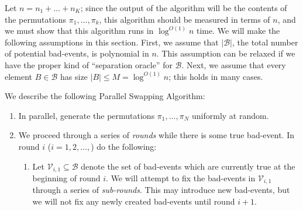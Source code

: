 Let $n = n_1 + \dots + n_K$; since the output of the algorithm will be the contents of the permutations $\pi_1, \dots, \pi_k$, this algorithm should be measured in terms of $n$, and we must show that this algorithm runs in $\log^{O(1)} n$ time.  We will make the following assumptions in this section.  First, we assume that $|\mathcal B|$, the total number of potential bad-events, is polynomial in $n$. This assumption can be relaxed if we have the proper kind of ``separation oracle'' for $\mathcal B$. Next, we assume that every element $B \in \mathcal B$ has size $|B| \leq M = \log^{O(1)} n$; this holds in many cases.

We describe the following Parallel Swapping Algorithm:
\begin{enumerate}
\item In parallel, generate the permutations $\pi_1, \dots, \pi_N$ uniformly at random.
\item We proceed through a series of \emph{rounds} while there is some true bad-event. In round $i$ ($i = 1, 2, \ldots,$) do the following:
\begin{enumerate}
\item[(3)] Let $\mathcal V_{i,1} \subseteq \mathcal B$ denote the set of bad-events which are currently true at the beginning of round $i$. We will attempt to fix the bad-events in $\mathcal V_{i,1}$ through a series of \emph{sub-rounds}. This may introduce new bad-events, but we will not fix any newly created bad-events until round $i+1$. 


\end{enumerate}
\end{enumerate}
